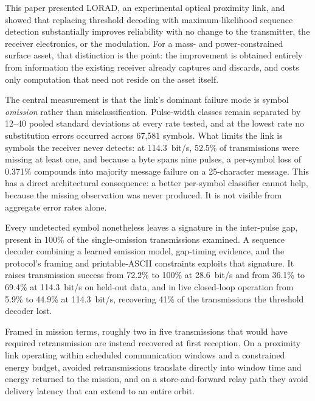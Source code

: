 This paper presented LORAD, an experimental optical proximity link, and showed
that replacing threshold decoding with maximum-likelihood sequence detection
substantially improves reliability with no change to the transmitter, the
receiver electronics, or the modulation. For a mass- and power-constrained
surface asset, that distinction is the point: the improvement is obtained
entirely from information the existing receiver already captures and discards,
and costs only computation that need not reside on the asset itself.

The central measurement is that the link's dominant failure mode is symbol
\emph{omission} rather than misclassification. Pulse-width classes remain
separated by 12--40 pooled standard deviations at every rate tested, and at the
lowest rate no substitution errors occurred across 67{,}581 symbols. What limits
the link is symbols the receiver never detects: at 114.3~bit/s, 52.5\% of
transmissions were missing at least one, and because a byte spans nine pulses, a
per-symbol loss of 0.371\% compounds into majority message failure on a
25-character message. This has a direct architectural consequence: a better
per-symbol classifier cannot help, because the missing observation was never
produced. It is not visible from aggregate error rates alone.

Every undetected symbol nonetheless leaves a signature in the inter-pulse gap,
present in 100\% of the single-omission transmissions examined. A sequence
decoder combining a learned emission model, gap-timing evidence, and the
protocol's framing and printable-ASCII constraints exploits that signature. It
raises transmission success from 72.2\% to 100\% at 28.6~bit/s and from 36.1\% to
69.4\% at 114.3~bit/s on held-out data, and in live closed-loop operation from
5.9\% to 44.9\% at 114.3~bit/s, recovering 41\% of the transmissions the
threshold decoder lost.

Framed in mission terms, roughly two in five transmissions that would have
required retransmission are instead recovered at first reception. On a
proximity link operating within scheduled communication windows and a
constrained energy budget, avoided retransmissions translate directly into
window time and energy returned to the mission, and on a store-and-forward
relay path they avoid delivery latency that can extend to an entire orbit.

